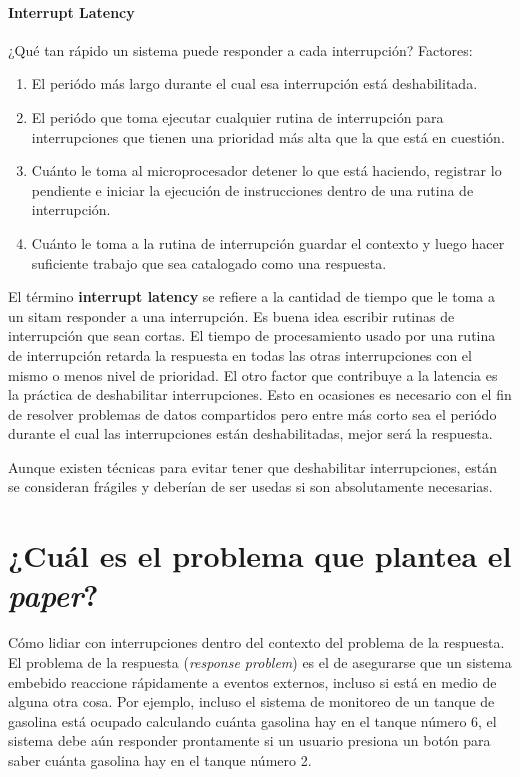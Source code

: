 \paragraph{\textnormal{\textbf{Interrupt Latency}}}
¿Qué tan rápido un sistema puede responder a cada interrupción? Factores:
\begin{enumerate}
    \item El periódo más largo durante el cual esa interrupción está deshabilitada.
    \item El periódo que toma ejecutar cualquier rutina de interrupción para interrupciones que tienen una prioridad más alta que la que está en cuestión.
    \item Cuánto le toma al microprocesador detener lo que está haciendo, registrar lo pendiente e iniciar la ejecución de instrucciones dentro de una rutina de interrupción.
    \item Cuánto le toma a la rutina de interrupción guardar el contexto y luego hacer suficiente trabajo que sea catalogado como una respuesta.
\end{enumerate}

El término \textbf{interrupt latency} se refiere a la cantidad de tiempo que le toma a un sitam responder a una interrupción. Es buena idea escribir rutinas de interrupción que sean cortas. El tiempo de procesamiento usado por una rutina de interrupción retarda la respuesta en todas las otras interrupciones con el mismo o menos nivel de prioridad. El otro factor que contribuye a la latencia es la práctica de deshabilitar interrupciones. Esto en ocasiones es necesario con el fin de resolver problemas de datos compartidos pero entre más corto sea el periódo durante el cual las interrupciones están deshabilitadas, mejor será la respuesta. 

Aunque existen técnicas para evitar tener que deshabilitar interrupciones, están se consideran frágiles y deberían de ser usedas si son absolutamente necesarias.


\section{¿Cuál es el problema que plantea el \textit{paper}?}
Cómo lidiar con interrupciones dentro del contexto del problema de la respuesta. El problema de la respuesta (\textit{response problem}) es el de asegurarse que un sistema embebido reaccione rápidamente a eventos externos, incluso si está en medio de alguna otra cosa. Por ejemplo, incluso el sistema de monitoreo de un tanque de gasolina está ocupado calculando cuánta gasolina hay en el tanque número 6, el sistema debe aún responder prontamente si un usuario presiona un botón para saber cuánta gasolina hay en el tanque número 2.


